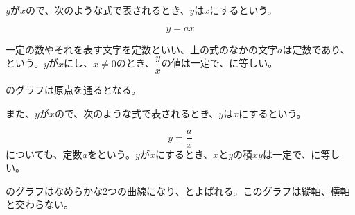 \documentclass[
  12pt,a4paper,lualatex,ja=standard]{bxjsarticle}
\begin{document}
\begin{flushleft}
$y$が$x$ので、次のような式で表されるとき、$y$は$x$にするという。

$$
y = ax
$$

一定の数やそれを表す文字を定数といい、上の式のなかの文字$a$は定数であり、という。$y$が$x$にし、$x \neq 0$のとき、$\dfrac{y}{x}$の値は一定で、に等しい。

のグラフは原点を通るとなる。

また、$y$が$x$ので、次のような式で表されるとき、$y$は$x$にするという。

$$
y = \dfrac{a}{x}
$$
についても、定数$a$をという。$y$が$x$にするとき、$x$と$y$の積$xy$は一定で、に等しい。

のグラフはなめらかな2つの曲線になり、とよばれる。このグラフは縦軸、横軸と交わらない。


\end{flushleft}
\end{document}
